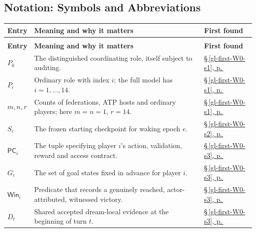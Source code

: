 \documentclass[11pt,letterpaper]{article}
\theoremstyle{definition}
\theoremstyle{plain}
\theoremstyle{definition}
\begin{document}
\subsection*{Notation: Symbols and Abbreviations}
\begingroup\small\setlength{\tabcolsep}{4pt}\renewcommand{\arraystretch}{1.16}
\begin{longtable}{@{}>{\raggedright\arraybackslash}p{.215\linewidth}>{\raggedright\arraybackslash}p{.585\linewidth}>{\raggedright\arraybackslash}p{.14\linewidth}@{}}
\toprule
\textbf{Entry} & \textbf{Meaning and why it matters} & \textbf{First found} \\
\midrule\endfirsthead
\multicolumn{3}{@{}l}{\footnotesize \emph{Notation: Symbols and Abbreviations (continued)}}\\
\toprule\textbf{Entry} & \textbf{Meaning and why it matters} & \textbf{First found} \\
\midrule\endhead
\bottomrule\endfoot
\textbf{$P_0$} & The distinguished coordinating role, itself subject to auditing. & \hyperref[gl-first-W0-s1]{\S\,\ref*{gl-first-W0-s1}, p.\,\pageref*{gl-first-W0-s1}} \\
\textbf{$P_i$} & Ordinary role with index $i$; the full model has $i=1,\ldots,14$. & \hyperref[gl-first-W0-s1]{\S\,\ref*{gl-first-W0-s1}, p.\,\pageref*{gl-first-W0-s1}} \\
\textbf{$m,n,r$} & Counts of federations, ATP hosts and ordinary players; here $m=n=1$, $r=14$. & \hyperref[gl-first-W0-s1]{\S\,\ref*{gl-first-W0-s1}, p.\,\pageref*{gl-first-W0-s1}} \\
\textbf{$S_e$} & The frozen starting checkpoint for waking epoch $e$. & \hyperref[gl-first-W0-s2]{\S\,\ref*{gl-first-W0-s2}, p.\,\pageref*{gl-first-W0-s2}} \\
\textbf{$\mathsf{PC}_i$} & The tuple specifying player $i$'s action, validation, reward and access contract. & \hyperref[gl-first-W0-s3]{\S\,\ref*{gl-first-W0-s3}, p.\,\pageref*{gl-first-W0-s3}} \\
\textbf{$G_i$} & The set of goal states fixed in advance for player $i$. & \hyperref[gl-first-W0-s3]{\S\,\ref*{gl-first-W0-s3}, p.\,\pageref*{gl-first-W0-s3}} \\
\textbf{$\mathsf{Win}_i$} & Predicate that records a genuinely reached, actor-attributed, witnessed victory. & \hyperref[gl-first-W0-s3]{\S\,\ref*{gl-first-W0-s3}, p.\,\pageref*{gl-first-W0-s3}} \\
\textbf{$D_t$} & Shared accepted dream-local evidence at the beginning of turn $t$. & \hyperref[gl-first-W0-s3]{\S\,\ref*{gl-first-W0-s3}, p.\,\pageref*{gl-first-W0-s3}} \\

\end{longtable}
\end{document}
